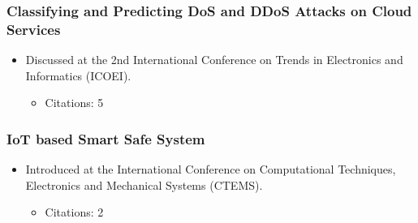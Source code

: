 \documentclass[11pt,a4paper]{article}
\begin{document}
\subsubsection*{Classifying and Predicting DoS and DDoS Attacks on Cloud Services}
\begin{itemize}
    \item Discussed at the 2nd International Conference on Trends in Electronics and Informatics (ICOEI).
    \begin{itemize}
        \item Citations: 5
    \end{itemize}
\end{itemize}

\subsubsection*{IoT based Smart Safe System}
\begin{itemize}
    \item Introduced at the International Conference on Computational Techniques, Electronics and Mechanical Systems (CTEMS).
    \begin{itemize}
        \item Citations: 2
    \end{itemize}
\end{itemize}
\end{document}
